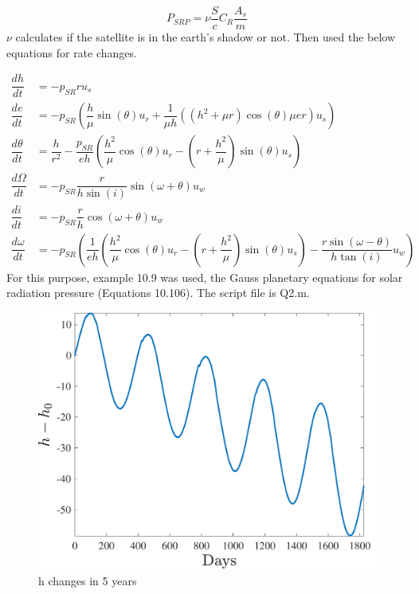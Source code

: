 $$
P_{SRP} = \nu \dfrac{S}{c}C_R \dfrac{A_s}{m}
$$
$\nu$ calculates if the satellite is in the earth's shadow or not.
Then used the below equations for rate changes.

\begin{equation*}
    \begin{split}
        \dfrac{dh}{dt} & = -p_{SR}ru_s \\
        \dfrac{de}{dt} & = -p_{SR} \left(\dfrac{h}{\mu} \sin(\theta)u_r+ \dfrac{1}{\mu h}\left((h^2+\mu r)\cos(\theta) \mu e r\right)u_s\right) \\
        \dfrac{d\theta}{dt} & = \dfrac{h}{r^2} - \dfrac{p_{SR}}{eh}\left(\dfrac{h^2}{\mu}\cos(\theta) u_r - \left(r+\dfrac{h^2}{\mu}\right)\sin(\theta)u_s\right) \\
        \dfrac{d\Omega}{dt} & = -p_{SR} \dfrac{r}{h\sin(i)}\sin(\omega + \theta)u_w\\
        \dfrac{di}{dt} & = -p_{SR} \dfrac{r}{h}\cos(\omega + \theta)u_w \\
        \dfrac{d\omega}{dt} & = -p_{SR} \left(\dfrac{1}{eh}\left(\dfrac{h^2}{\mu}\cos(\theta)u_r - \left(r+\dfrac{h^2}{\mu}\right)\sin(\theta)u_s\right)-\dfrac{r\sin(\omega - \theta)}{h\tan(i)}u_w\right)
    \end{split}
\end{equation*}
For this purpose, example 10.9 was used, the Gauss planetary equations for solar radiation pressure (Equations 10.106). The script file is Q2.m.

\begin{figure}[H]
    \caption{h changes in 5 years}
    \centering
    \includegraphics[width=12cm]{../Figure/Q2/h_fig}
\end{figure}

